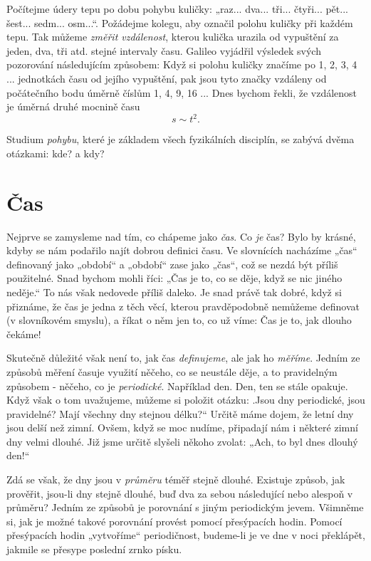 {    Počítejme údery tepu po dobu pohybu kuličky: „raz... dva... tři... čtyři... pět... šest... 
    sedm... osm...“. Požádejme kolegu, aby označil polohu kuličky při každém tepu. Tak můžeme 
    \emph{změřit vzdálenost}, kterou kulička urazila od vypuštění za jeden, dva, tři atd. stejné 
    intervaly času. Galileo vyjádřil výsledek svých pozorování následujícím způsobem: Když si 
    polohu kuličky značíme po \num{1}, \num{2}, \num{3}, \num{4} ... jednotkách času od jejího 
    vypuštění, pak jsou tyto značky vzdáleny od počátečního bodu úměrně číslům \num{1}, \num{4}, 
    \num{9}, \num{16} ... Dnes bychom řekli, že vzdálenost je úměrná druhé mocnině času
    \begin{equation*}
      s \sim t^2.
    \end{equation*}
    
    Studium \emph{pohybu}, které je základem všech fyzikálních disciplín, se zabývá dvěma otázkami: 
    kde? a kdy?
    
  \section{Čas}
    Nejprve se zamysleme nad tím, co chápeme jako \emph{čas}. Co \emph{je} čas? Bylo by krásné, 
    kdyby se nám podařilo najít dobrou definici času. Ve slovnících nacházíme „čas“ definovaný jako 
    „období“ a „období“ zase jako „čas“, což se nezdá být příliš použitelné. Snad bychom mohli 
    říci: „Čas je to, co se děje, když se nic jiného neděje.“ To nás však nedovede příliš daleko. 
    Je snad právě tak dobré, když si přiznáme, že čas je jedna z těch věcí, kterou pravděpodobně 
    nemůžeme definovat (v slovníkovém smyslu), a říkat o něm jen to, co už víme: Čas je to, jak 
    dlouho čekáme!
    
    Skutečně důležité však není to, jak čas \emph{definujeme}, ale jak ho \emph{měříme}. Jedním ze 
    způsobů měření časuje využití něčeho, co se neustále děje, a to pravidelným způsobem - něčeho, 
    co je \emph{periodické}. Například den. Den, ten se stále opakuje. Když však o tom uvažujeme, 
    můžeme si položit otázku: .Jsou dny periodické, jsou pravidelné? Mají všechny dny stejnou 
    délku?“ Určitě máme dojem, že letní dny jsou delší než zimní. Ovšem, když se moc nudíme, 
    připadají nám i některé zimní dny velmi dlouhé. Již jsme určitě slyšeli někoho zvolat: „Ach, to 
    byl dnes dlouhý den!“
    
    Zdá se však, že dny jsou v \emph{průměru} téměř stejně dlouhé. Existuje způsob, jak prověřit, 
    jsou-li dny stejně dlouhé, buď dva za sebou následující nebo alespoň v průměru? Jedním ze 
    způsobů je porovnání s jiným periodickým jevem. Všimněme si, jak je možné takové porovnání 
    provést pomocí přesýpacích hodin. Pomocí přesýpacích hodin „vytvoříme“ periodičnost, budeme-li 
    je ve dne v noci překlápět, jakmile se přesype poslední zrnko písku.
    
}
